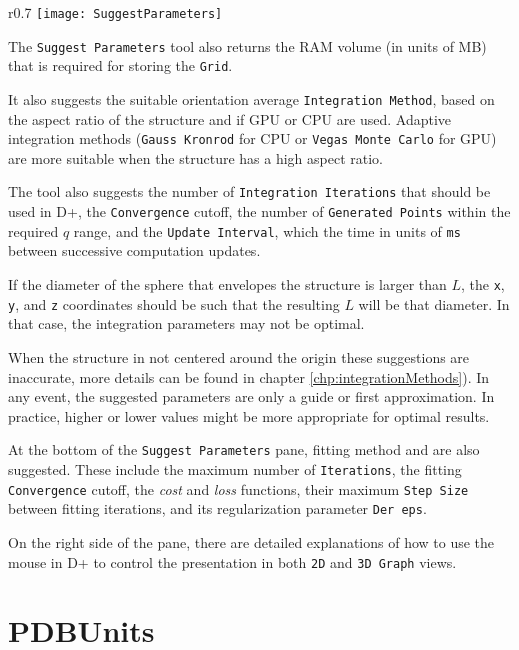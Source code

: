 \documentclass[../D+Manual.tex]{subfiles}
\begin{document}
\begin{wrapfigure}{r}{0.7\textwidth}
	\vspace{-10pt}
	\centering
	\texttt{[image: SuggestParameters]}
	\vspace{-10pt}
\end{wrapfigure}

The \texttt{Suggest Parameters} tool also returns the RAM volume (in units of MB) that is required for storing the \texttt{Grid}. 

It also suggests the suitable orientation average \texttt{Integration Method}, based on the aspect ratio of the structure and if GPU or CPU are used. Adaptive integration methods (\texttt{Gauss Kronrod} for CPU or \texttt{Vegas Monte Carlo} for GPU) are more suitable when the structure has a high aspect ratio.

The tool also suggests the number of \texttt{Integration Iterations} that should be used in D+, the \texttt{Convergence} cutoff, the number of \texttt{Generated Points} within the required $q$ range, and the \texttt{Update Interval}, which the time in units of \texttt{ms} between successive computation updates. 

If the diameter of the sphere that envelopes the structure is larger than $L$, the \texttt{x}, \texttt{y}, and \texttt{z} coordinates should be such that the resulting $L$ will be that diameter. In that case, the integration parameters may not be optimal.

When the structure in not centered around the origin these suggestions are inaccurate, more details can be found in chapter \ref{chp:integrationMethods}).
In any event, the suggested parameters are only a guide or first approximation. In practice, higher or lower values might be more appropriate for optimal results. 

At the bottom of the \texttt{Suggest Parameters} pane, fitting method and  are also suggested. These include the maximum number of \texttt{Iterations}, the fitting \texttt{Convergence} cutoff, the \textit{cost} and \textit{loss} functions, their maximum \texttt{Step Size} between fitting iterations, and its regularization parameter \texttt{Der eps}. 

On the right side of the pane, there are detailed explanations of how to use the mouse in D+ to control the presentation in both \texttt{2D} and \texttt{3D Graph} views.   

\section{PDBUnits}
\label{PDBUnit}
\end{document}
